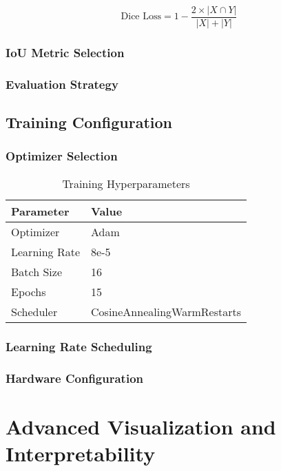 \documentclass[12pt,a4paper]{report}
\begin{document}
\begin{equation}
\text{Dice Loss} = 1 - \frac{2 \times |X \cap Y|}{|X| + |Y|}
\end{equation}

\subsubsection{IoU Metric Selection}

\subsubsection{Evaluation Strategy}

\subsection{Training Configuration}

\subsubsection{Optimizer Selection}

\begin{table}[H]
\centering
\caption{Training Hyperparameters}
\begin{tabular}{|l|l|}
\hline
\textbf{Parameter} & \textbf{Value} \\
\hline
Optimizer & Adam \\
\hline
Learning Rate & 8e-5 \\
\hline
Batch Size & 16 \\
\hline
Epochs & 15 \\
\hline
Scheduler & CosineAnnealingWarmRestarts \\
\hline
\end{tabular}
\end{table}

\subsubsection{Learning Rate Scheduling}

\subsubsection{Hardware Configuration}

\section{Advanced Visualization and Interpretability}
\end{document}
